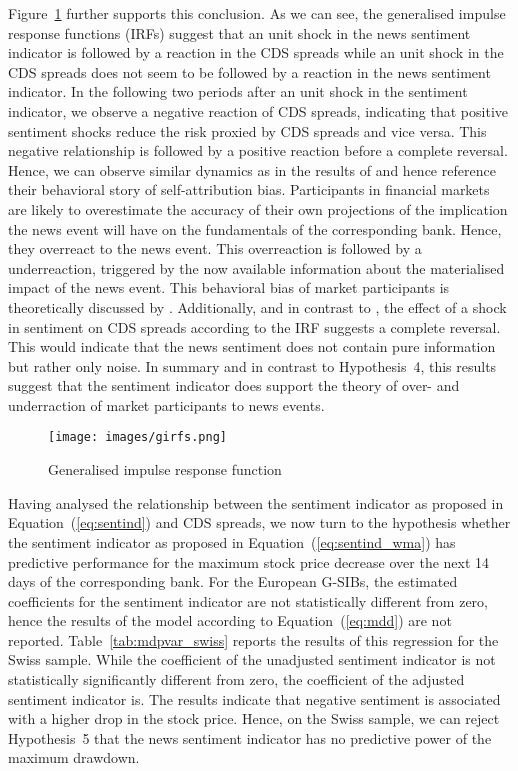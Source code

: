 \mbox{Figure~\ref{fig:girfs}} further supports this conclusion. As we can see, the generalised impulse response functions (IRFs) suggest that an unit shock in the news sentiment indicator is followed by a reaction in the CDS spreads while an unit shock in the CDS spreads does not seem to be followed by a reaction in the news sentiment indicator. In the following two periods after an unit shock in the sentiment indicator, we observe a negative reaction of CDS spreads, indicating that positive sentiment shocks reduce the risk proxied by CDS spreads and vice versa. This negative relationship is followed by a positive reaction before a complete reversal. Hence, we can observe similar dynamics as in the results of \cite{cathcart2020} and hence reference their behavioral story of self-attribution bias. Participants in financial markets are likely to overestimate the accuracy of their own projections of the implication the news event will have on the fundamentals of the corresponding bank. Hence, they overreact to the news event. This overreaction is followed by a underreaction, triggered by the now available information about the materialised impact of the news event. This behavioral bias of market participants is theoretically discussed by \cite{daniel1998}. Additionally, and in contrast to \cite{cathcart2020}, the effect of a shock in sentiment on CDS spreads according to the IRF suggests a complete reversal. This would indicate that the news sentiment does not contain pure information but rather only noise. In summary and in contrast to \mbox{Hypothesis~4}, this results suggest that the sentiment indicator does support the theory of over- and underraction of market participants to news events.

\begin{figure}[H]
    \centering
    \texttt{[image: images/girfs.png]}
    \caption{Generalised impulse response function}
    \label{fig:girfs}
\end{figure}


Having analysed the relationship between the sentiment indicator as proposed in \mbox{Equation~(\ref{eq:sentind})} and CDS spreads, we now turn to the hypothesis whether the sentiment indicator as proposed in \mbox{Equation~(\ref{eq:sentind_wma})} has predictive performance for the maximum stock price decrease over the next 14 days of the corresponding bank. For the European G-SIBs, the estimated coefficients for the sentiment indicator are not statistically different from zero, hence the results of the model according to \mbox{Equation~(\ref{eq:mdd})} are not reported. \mbox{Table~\ref{tab:mdpvar_swiss}} reports the results of this regression for the Swiss sample. While the coefficient of the unadjusted sentiment indicator is not statistically significantly different from zero, the coefficient of the adjusted sentiment indicator is. The results indicate that negative sentiment is associated with a higher drop in the stock price. Hence, on the Swiss sample, we can reject \mbox{Hypothesis~5} that the news sentiment indicator has no predictive power of the maximum drawdown. \\

